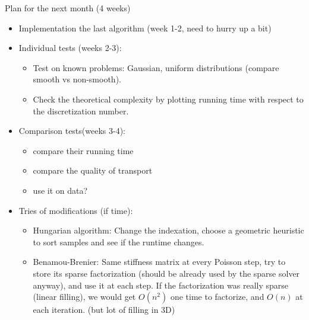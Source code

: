 \documentclass{beamer}
\begin{document}
\begin{frame}{Plan for the next month (4 weeks)}
\begin{itemize}
    \item Implementation the last algorithm (week 1-2, need to hurry up a bit)
    \item Individual tests (weeks 2-3):
    \begin{itemize}
        \item Test on known problems: Gaussian, uniform distributions (compare smooth vs non-smooth).
        \item Check the theoretical complexity by plotting running time with respect to the discretization number.
    \end{itemize}
    \item Comparison tests(weeks 3-4):
    \begin{itemize}
        \item compare their running time
        \item compare the quality of transport
        \item use it on data?
    \end{itemize}
    \item Tries of modifications (if time):
    \begin{itemize}
        \item Hungarian algorithm: Change the indexation, choose a geometric heuristic to sort samples and see if the runtime changes.
        \item Benamou-Brenier: Same stiffness matrix at every Poisson step, try to store its sparse factorization (should be already used by the sparse solver anyway), and use it at each step. If the factorization was really sparse (linear filling), we would get $O(n^2)$ one time to factorize, and  $O(n)$ at each iteration. (but lot of filling in 3D)
        \end{itemize}
\end{itemize}
\end{frame}
\end{document}
